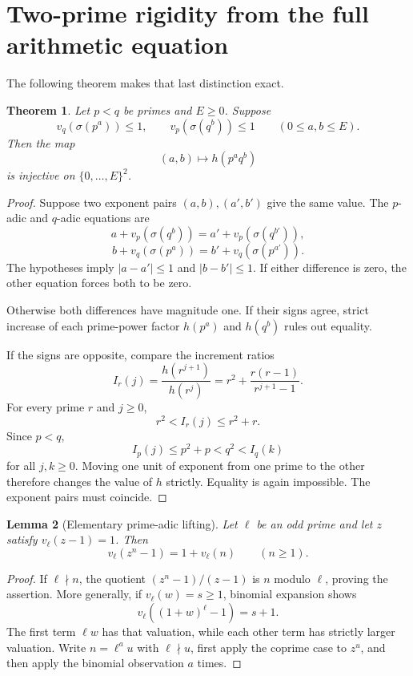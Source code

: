 \documentclass[11pt]{article}
\newtheorem{theorem}{Theorem}[section]
\newtheorem{lemma}[theorem]{Lemma}
\begin{document}
\section{Two-prime rigidity from the full arithmetic equation}
The following theorem makes that last distinction exact.

\begin{theorem}\label{thm:rigidity}
Let $p<q$ be primes and $E\ge0$. Suppose
\[
 v_q(\sigma(p^a))\le1,\qquad v_p(\sigma(q^b))\le1
 \qquad(0\le a,b\le E).
\]
Then the map
\[
 (a,b)\longmapsto h(p^a q^b)
\]
is injective on $\{0,\ldots,E\}^2$.
\end{theorem}
\begin{proof}
Suppose two exponent pairs $(a,b),(a',b')$ give the same value. The $p$-adic and $q$-adic equations are
\[
 a+v_p(\sigma(q^b))=a'+v_p(\sigma(q^{b'})),
\]
\[
 b+v_q(\sigma(p^a))=b'+v_q(\sigma(p^{a'})).
\]
The hypotheses imply $|a-a'|\le1$ and $|b-b'|\le1$. If either difference is zero, the other equation forces both to be zero.

Otherwise both differences have magnitude one. If their signs agree, strict increase of each prime-power factor $h(p^a)$ and $h(q^b)$ rules out equality.

If the signs are opposite, compare the increment ratios
\[
 I_r(j)=\frac{h(r^{j+1})}{h(r^j)}
 =r^2+\frac{r(r-1)}{r^{j+1}-1}.
\]
For every prime $r$ and $j\ge0$,
\[
 r^2<I_r(j)\le r^2+r.
\]
Since $p<q$,
\[
 I_p(j)\le p^2+p<q^2<I_q(k)
\]
for all $j,k\ge0$. Moving one unit of exponent from one prime to the other therefore changes the value of $h$ strictly. Equality is again impossible. The exponent pairs must coincide.
\end{proof}

\begin{lemma}[Elementary prime-adic lifting]\label{lem:lifting}
Let $\ell$ be an odd prime and let $z$ satisfy $v_\ell(z-1)=1$. Then
\[
 v_\ell(z^n-1)=1+v_\ell(n)\qquad(n\ge1).
\]
\end{lemma}
\begin{proof}
If $\ell\nmid n$, the quotient $(z^n-1)/(z-1)$ is $n$ modulo $\ell$, proving the assertion. More generally, if $v_\ell(w)=s\ge1$, binomial expansion shows
\[
 v_\ell((1+w)^\ell-1)=s+1.
\]
The first term $\ell w$ has that valuation, while each other term has strictly larger valuation. Write $n=\ell^a u$ with $\ell\nmid u$, first apply the coprime case to $z^u$, and then apply the binomial observation $a$ times.
\end{proof}
\end{document}
